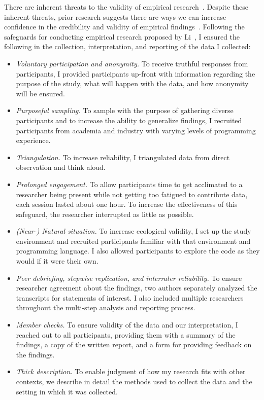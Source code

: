 There are inherent threats to the validity of empirical 
research~\cite{onwuegbuzie2007validity}.
Despite these inherent threats, prior research suggests there are ways
we can increase confidence in the credibility and validity of empirical
findings~\cite{gasson2004rigor,li2004trustworthiness}.
Following the safeguards for conducting empirical research proposed by
Li~\cite{li2004trustworthiness}, I ensured the following in the collection,
interpretation, and reporting of the data I collected:
\begin{itemize}
	\item \textit{Voluntary participation and anonymity.} To receive truthful
	responses from participants, I provided participants up-front with information
	regarding the purpose of the study, what will happen with the data, and how
	anonymity will be ensured.
	\item \textit{Purposeful sampling.} To sample with the purpose
	of gathering diverse participants and to increase
	the ability to generalize findings, I recruited participants from
	academia and industry with varying levels of programming experience.
	\item \textit{Triangulation.} To increase reliability, I triangulated data from direct observation and think aloud.
	\item \textit{Prolonged engagement.} 
	To allow participants time to get acclimated to a researcher being present
	while not getting too fatigued to contribute data,
	each session lasted about one
	hour. To increase the effectiveness
	of this safeguard, the researcher interrupted as little as possible.
	\item \textit{(Near-) Natural situation.} 
	To increase ecological validity, I set up the study environment and
	recruited participants familiar with that environment and programming language.
	I also allowed participants to explore the code as they would if it were their
	own.
	\item \textit{Peer debriefing, stepwise replication, and interrater reliability.} 
	To ensure researcher agreement about the findings, two authors separately 
	analyzed the transcripts for statements of interest. 
	I also included multiple researchers
	throughout the multi-step analysis and reporting process.
	\item \textit{Member checks.} To ensure validity of
	the data and our interpretation, I reached out to all participants, providing
	them with a summary of the findings, a copy of the written report, and a form
	for providing feedback on the findings.
	\item \textit{Thick description.} To enable judgment of how my research fits with other contexts, we describe in detail the methods used to collect the data and the setting in which it was collected.
\end{itemize}


